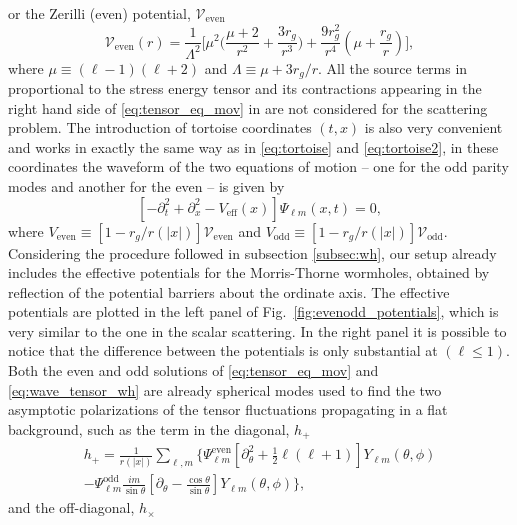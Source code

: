 \documentclass[article,aps,nofootinbib,twocolumn,superscriptaddress]{revtex4-1}
\begin{document}
or the Zerilli (even) potential, $\mathcal{V}_{\mathrm{even}}$ 
\begin{equation}
\mathcal{V}_{\mathrm{even}}(r)=\displaystyle{\frac{1}{\Lambda^2}\bigg[\mu^2\bigg(\frac{\mu+2}{r^2}+\frac{3r_g}{r^3}\bigg)+\frac{9r_g^2}{r^4}\left(\mu+\frac{r_g}{r}\right)\bigg]},
\label{eq:V_even}
\end{equation} 
where $\mu\equiv(\ell-1)(\ell+2)$ and $\Lambda\equiv\mu+3r_g/r$. All the source terms in proportional to the stress energy tensor and its contractions appearing in the right hand side of \eqref{eq:tensor_eq_mov} in \citep{Martel:2005ir} are not considered for the scattering problem. The introduction of tortoise coordinates $(t,x)$ is also very convenient and works in exactly the same way as in \eqref{eq:tortoise} and \eqref{eq:tortoise2}, in these coordinates the waveform of the two equations of motion -- one for the odd parity modes and another for the even -- is given by 
\begin{equation}
\left[-\partial_t^2+\partial_x^2-V_{\mathrm{eff}}(x)\right]\Psi_{\ell m}(x,t) = 0,
\label{eq:wave_tensor_wh}
\end{equation}
where $V_{\mathrm{even}}\equiv[1-r_g/r(|x|)]\mathcal{V}_{\mathrm{even}}$ and $V_{\mathrm{odd}}\equiv[1-r_g/r(|x|)]\mathcal{V}_{\mathrm{odd}}$. Considering the procedure followed in subsection \ref{subsec:wh}, our setup already includes the effective potentials for the Morris-Thorne wormholes, obtained by reflection of the potential barriers about the ordinate axis. The effective potentials are plotted in the left panel of Fig.~\ref{fig:evenodd_potentials}, which is very similar to the one in the scalar scattering. In the right panel it is possible to notice that the difference between the potentials is only substantial at $(\ell\leq1)$. Both the even and odd solutions of \eqref{eq:tensor_eq_mov} and \eqref{eq:wave_tensor_wh} are already spherical modes used to find the two asymptotic polarizations of the tensor fluctuations propagating in a flat background, such as the term in the diagonal, $h_+$ 
\begin{align}
\displaystyle{h_+=\frac{1}{r(|x|)}\sum_{\ell,m}\bigg\{\Psi_{\ell m}^{\mathrm{even}}\left[\partial^2_{\theta}+\frac{1}{2}\ell(\ell+1)\right]Y_{\ell m}(\theta,\phi)}\nonumber\\
\displaystyle{-\Psi_{\ell m}^{\mathrm{odd}}\frac{i m}{\sin\theta}\left[\partial_{\theta}-\frac{\cos\theta}{\sin\theta}\right]Y_{\ell m}(\theta,\phi)\bigg\}},
\label{eq:hplus}
\end{align} 
and the off-diagonal, $h_{\times}$ 
\end{document}
